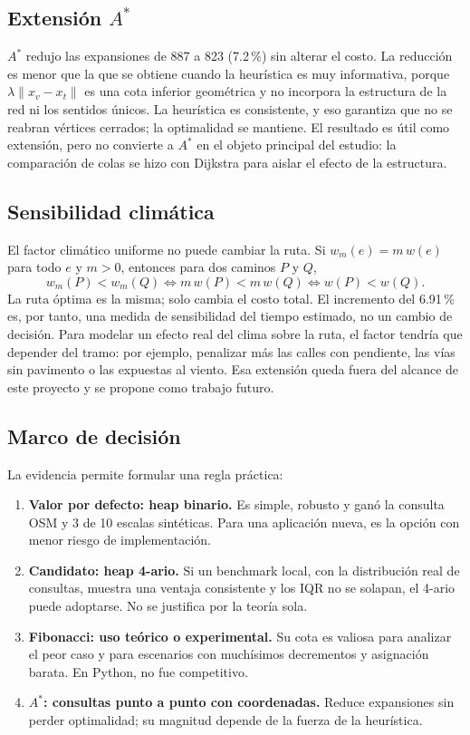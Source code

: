 \subsection{Extensión $A^*$}
$A^*$ redujo las expansiones de 887 a 823 (7.2\,\%) sin alterar el costo. La reducción es menor que la que se obtiene cuando la heurística es muy informativa, porque $\lambda\lVert x_v-x_t\rVert$ es una cota inferior geométrica y no incorpora la estructura de la red ni los sentidos únicos. La heurística es consistente, y eso garantiza que no se reabran vértices cerrados; la optimalidad se mantiene. El resultado es útil como extensión, pero no convierte a $A^*$ en el objeto principal del estudio: la comparación de colas se hizo con Dijkstra para aislar el efecto de la estructura.

\subsection{Sensibilidad climática}
El factor climático uniforme no puede cambiar la ruta. Si $w_m(e)=m\,w(e)$ para todo $e$ y $m>0$, entonces para dos caminos $P$ y $Q$,
\begin{equation}
    w_m(P)<w_m(Q)\iff m\,w(P)<m\,w(Q)\iff w(P)<w(Q).
    \label{eq:invariancia}
\end{equation}
La ruta óptima es la misma; solo cambia el costo total. El incremento del 6.91\,\% es, por tanto, una medida de sensibilidad del tiempo estimado, no un cambio de decisión. Para modelar un efecto real del clima sobre la ruta, el factor tendría que depender del tramo: por ejemplo, penalizar más las calles con pendiente, las vías sin pavimento o las expuestas al viento. Esa extensión queda fuera del alcance de este proyecto y se propone como trabajo futuro.

\subsection{Marco de decisión}
La evidencia permite formular una regla práctica:
\begin{enumerate}
    \item \textbf{Valor por defecto: heap binario.} Es simple, robusto y ganó la consulta OSM y 3 de 10 escalas sintéticas. Para una aplicación nueva, es la opción con menor riesgo de implementación.
    \item \textbf{Candidato: heap 4-ario.} Si un benchmark local, con la distribución real de consultas, muestra una ventaja consistente y los IQR no se solapan, el 4-ario puede adoptarse. No se justifica por la teoría sola.
    \item \textbf{Fibonacci: uso teórico o experimental.} Su cota es valiosa para analizar el peor caso y para escenarios con muchísimos decrementos y asignación barata. En Python, no fue competitivo.
    \item \textbf{$A^*$: consultas punto a punto con coordenadas.} Reduce expansiones sin perder optimalidad; su magnitud depende de la fuerza de la heurística.
\end{enumerate}

